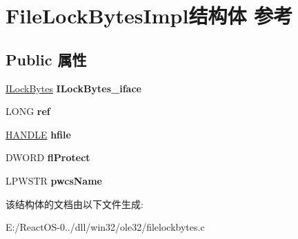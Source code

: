\hypertarget{struct_file_lock_bytes_impl}{}\section{File\+Lock\+Bytes\+Impl结构体 参考}
\label{struct_file_lock_bytes_impl}
\subsection*{Public 属性}
\begin{DoxyCompactItemize}
\item 
\mbox{\label{struct_file_lock_bytes_impl_a5b8c181dc7e6a9faf16c1774a07a9dca}} 
\hyperlink{interface_i_lock_bytes}{I\+Lock\+Bytes} {\bfseries I\+Lock\+Bytes\+\_\+iface}
\item 
\mbox{\label{struct_file_lock_bytes_impl_a9374d65b08cc130953d23ba7e2a0e9ba}} 
L\+O\+NG {\bfseries ref}
\item 
\mbox{\label{struct_file_lock_bytes_impl_a26cbf03c5906105802021a96cfe3c1d5}} 
\hyperlink{interfacevoid}{H\+A\+N\+D\+LE} {\bfseries hfile}
\item 
\mbox{\label{struct_file_lock_bytes_impl_a80fd6ac330e3e130939036af0206b461}} 
D\+W\+O\+RD {\bfseries fl\+Protect}
\item 
\mbox{\label{struct_file_lock_bytes_impl_a7e9df762f81a9f47835ba557a54d0538}} 
L\+P\+W\+S\+TR {\bfseries pwcs\+Name}
\end{DoxyCompactItemize}


该结构体的文档由以下文件生成\+:\begin{DoxyCompactItemize}
\item 
E\+:/\+React\+O\+S-\/0../dll/win32/ole32/filelockbytes.\+c\end{DoxyCompactItemize}
